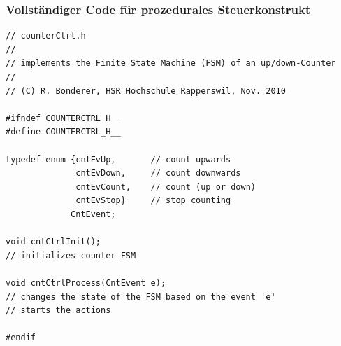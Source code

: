 \subsubsection{Vollständiger Code für prozedurales Steuerkonstrukt}
\begin{lstlisting}[style=C]
// counterCtrl.h
//
// implements the Finite State Machine (FSM) of an up/down-Counter
//
// (C) R. Bonderer, HSR Hochschule Rapperswil, Nov. 2010

#ifndef COUNTERCTRL_H__
#define COUNTERCTRL_H__

typedef enum {cntEvUp,       // count upwards
              cntEvDown,     // count downwards
              cntEvCount,    // count (up or down)
              cntEvStop}     // stop counting
             CntEvent;

void cntCtrlInit();
// initializes counter FSM

void cntCtrlProcess(CntEvent e);
// changes the state of the FSM based on the event 'e'
// starts the actions

#endif
\end{lstlisting}
